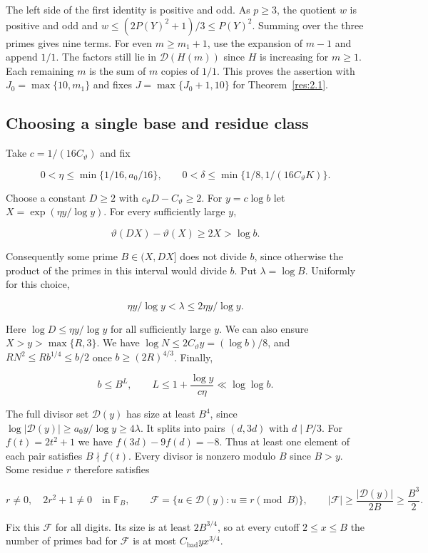 \documentclass[11pt,a4paper]{article}
\begin{document}
The left side of the first identity is positive and odd. As $p\ge3$, the quotient $w$ is positive and odd and $w\le (2P(Y)^2+1)/3\le P(Y)^2$. Summing over the three primes gives nine terms. For even $m\ge m_1+1$, use the expansion of $m-1$ and append $1/1$. The factors still lie in $\mathcal D(H(m))$ since $H$ is increasing for $m\ge1$. Each remaining $m$ is the sum of $m$ copies of $1/1$. This proves the assertion with $J_0=\max\{10,m_1\}$ and fixes $J=\max\{J_0+1,10\}$ for Theorem~\ref{res:2.1}.

\subsection{Choosing a single base and residue class}

Take $c=1/(16C_\vartheta)$ and fix

\[
0<\eta\le\min\{1/16,a_0/16\},\qquad
0<\delta\le\min\{1/8,1/(16C_\vartheta K)\}.
\]

Choose a constant $D\ge2$ with $c_\vartheta D-C_\vartheta\ge2$. For $y=c\log b$ let $X=\exp(\eta y/\log y)$. For every sufficiently large $y$,

\[
\vartheta(DX)-\vartheta(X)\ge2X>\log b .
\]

Consequently some prime $B\in(X,DX]$ does not divide $b$, since otherwise the product of the primes in this interval would divide $b$. Put $\lambda=\log B$. Uniformly for this choice,

\[
\eta y/\log y<\lambda\le2\eta y/\log y .
\]

Here $\log D\le\eta y/\log y$ for all sufficiently large $y$. We can also ensure $X>y>\max\{R,3\}$. We have $\log N\le2C_\vartheta y=(\log b)/8$, and $RN^2\le Rb^{1/4}\le b/2$ once $b\ge(2R)^{4/3}$. Finally,

\[
b\le B^L,\qquad L\le1+\frac{\log y}{c\eta}\ll\log\log b .
\]

The full divisor set $\mathcal D(y)$ has size at least $B^4$, since $\log|\mathcal D(y)|\ge a_0y/\log y\ge4\lambda$. It splits into pairs $(d,3d)$ with $d\mid P/3$. For $f(t)=2t^2+1$ we have $f(3d)-9f(d)=-8$. Thus at least one element of each pair satisfies $B\nmid f(t)$. Every divisor is nonzero modulo $B$ since $B>y$. Some residue $r$ therefore satisfies

\[
r\ne0,\quad 2r^2+1\ne0\quad\text{in }\mathbb F_B,\qquad
\mathcal F=\{u\in\mathcal D(y):u\equiv r\pmod B\},\qquad
|\mathcal F|\ge\frac{|\mathcal D(y)|}{2B}\ge\frac{B^3}{2}.
\]

Fix this $\mathcal F$ for all digits. Its size is at least $2B^{3/4}$, so at every cutoff $2\le x\le B$ the number of primes bad for $\mathcal F$ is at most $C_{\mathrm{bad}}y x^{3/4}$.
\end{document}
